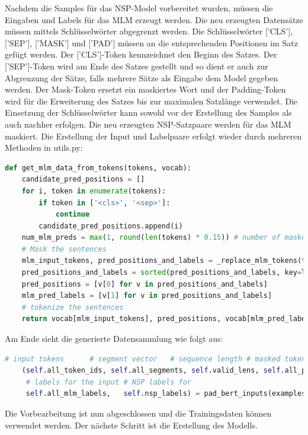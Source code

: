 Nachdem die Samples für das NSP-Model vorbereitet wurden, müssen die Eingaben und Labels für das MLM erzeugt werden. Die neu erzeugten Datensätze müssen mittels Schlüsselwörter abgegrenzt werden. Die Schlüsselwörter ['CLS'], ['SEP'], ['MASK'] und ['PAD'] müssen an die entsprechenden Positionen im Satz gefügt werden. Der ['CLS']-Token kennzeichnet den Beginn des Satzes. Der ['SEP']-Token wird am Ende des Satzes gestellt und so dient er auch zur Abgrenzung der Sätze, falls mehrere Sätze als Eingabe dem Model gegeben werden. Der Mask-Token ersetzt ein maskiertes Wort und der Padding-Token wird für die Erweiterung des Satzes bis zur maximalen Satzlänge verwendet. Die Einsetzung der Schlüsselwörter kann sowohl vor der Erstellung des Samples als auch nachher erfolgen. Die neu erzeugten NSP-Satzpaare werden für das MLM maskiert. Die Erstellung der Input und Labelpaare erfolgt wieder durch mehreren Methoden in utils.py:

\begin{lstlisting}[language=Python, caption={Erstellen von Trainingsdaten für MLM}]
def get_mlm_data_from_tokens(tokens, vocab):
	candidate_pred_positions = []
	for i, token in enumerate(tokens):
		if token in ['<cls>', '<sep>']:
			continue
		candidate_pred_positions.append(i)
	num_mlm_preds = max(1, round(len(tokens) * 0.15)) # number of masked tokens
	# Mask the sentences
	mlm_input_tokens, pred_positions_and_labels = _replace_mlm_tokens(tokens, candidate_pred_positions, num_mlm_preds, vocab)
	pred_positions_and_labels = sorted(pred_positions_and_labels, key=lambda x: x[0])
	pred_positions = [v[0] for v in pred_positions_and_labels]
	mlm_pred_labels = [v[1] for v in pred_positions_and_labels]
	# tokenize the sentences
	return vocab[mlm_input_tokens], pred_positions, vocab[mlm_pred_labels]
\end{lstlisting}

Am Ende sieht die generierte Datensammlung wie folgt aus:
\begin{lstlisting}[language=Python, caption={Eingabedaten}]
	 # input tokens    	 # segment vector	# sequence length # masked token index	  # weights for the label
	(self.all_token_ids, self.all_segments, self.valid_lens, self.all_pred_positions, self.all_mlm_weights,
	 # labels for the input # NSP labels for
	 self.all_mlm_labels, 	self.nsp_labels) = pad_bert_inputs(examples, max_len, self.vocab)
\end{lstlisting}

Die Vorbearbeitung ist nun abgeschlossen und die Trainingsdaten können verwendet werden. Der nächste Schritt ist die Erstellung des Modells. 
